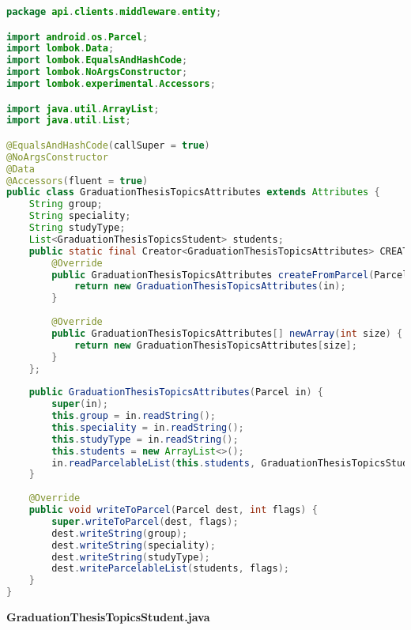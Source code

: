 \begin{lstlisting}[language=Java]
package api.clients.middleware.entity;

import android.os.Parcel;
import lombok.Data;
import lombok.EqualsAndHashCode;
import lombok.NoArgsConstructor;
import lombok.experimental.Accessors;

import java.util.ArrayList;
import java.util.List;

@EqualsAndHashCode(callSuper = true)
@NoArgsConstructor
@Data
@Accessors(fluent = true)
public class GraduationThesisTopicsAttributes extends Attributes {
	String group;
	String speciality;
	String studyType;
	List<GraduationThesisTopicsStudent> students;
	public static final Creator<GraduationThesisTopicsAttributes> CREATOR = new Creator<GraduationThesisTopicsAttributes>() {
		@Override
		public GraduationThesisTopicsAttributes createFromParcel(Parcel in) {
			return new GraduationThesisTopicsAttributes(in);
		}
		
		@Override
		public GraduationThesisTopicsAttributes[] newArray(int size) {
			return new GraduationThesisTopicsAttributes[size];
		}
	};
	
	public GraduationThesisTopicsAttributes(Parcel in) {
		super(in);
		this.group = in.readString();
		this.speciality = in.readString();
		this.studyType = in.readString();
		this.students = new ArrayList<>();
		in.readParcelableList(this.students, GraduationThesisTopicsStudent.class.getClassLoader());
	}
	
	@Override
	public void writeToParcel(Parcel dest, int flags) {
		super.writeToParcel(dest, flags);
		dest.writeString(group);
		dest.writeString(speciality);
		dest.writeString(studyType);
		dest.writeParcelableList(students, flags);
	}
}

\end{lstlisting}
\textbf{GraduationThesisTopicsStudent.java}

